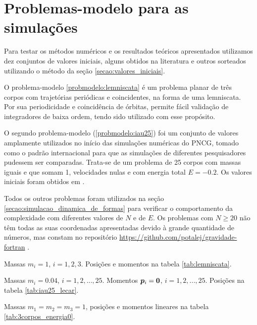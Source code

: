 \chapter{Problemas-modelo para as simulações}\label{apendice:problemas-modelo}

Para testar os métodos numéricos e os resultados teóricos apresentados utilizamos dez conjuntos de valores iniciais, alguns obtidos na literatura e outros sorteados utilizando o método da seção \ref{secao:valores_iniciais}.

O problema-modelo \ref{probmodelo:lemniscata} é um problema planar de três corpos com trajetórias periódicas e coincidentes, na forma de uma lemniscata. Por sua periodicidade e coincidência de órbitas, permite fácil validação de integradores de baixa ordem, tendo sido utilizado com esse propósito.

O segundo problema-modelo (\ref{probmodelo:iau25}) foi um conjunto de valores amplamente utilizados no início das simulações numéricas do PNCG, tomado como o padrão internacional para que as simulações de diferentes pesquisadores pudessem ser comparadas. Trata-se de um problema de 25 corpos com massas iguais e que somam 1, velocidades nulas e com energia total $E=-0.2$. Os valores iniciais foram obtidos em \cite{Lecar1968}.

Todos os outros problemas foram utilizados na seção \ref{secao:simulacao_dinamica_de_formas} para verificar o comportamento da complexidade com diferentes valores de $N$ e de $E$. Os problemas com $N \geq 20$ não têm todas as suas coordenadas apresentadas devido à grande quantidade de números, mas constam no repositório \href{https://github.com/Potalej/gravidade-fortran}{https://github.com/potalej/gravidade-fortran} \citep{potalej_gravidade-fortran}.

\begin{probmodelo}\label{probmodelo:lemniscata}
    Massas $m_i = 1$, $i=1,2,3$. Posições e momentos na tabela \ref{tab:lemniscata}.
    
\end{probmodelo}

\begin{probmodelo}\label{probmodelo:iau25} 
    Massas $m_i = 0.04$, $i=1,2,...,25$. Momentos $\bm p_i = \bm 0$, $i=1,2,...,25$. Posições na tabela \ref{tab:iau25_lecar}.
    
\end{probmodelo}

\begin{probmodelo}\label{probmodelo:3corpos_energia_nula}
    Massas $m_1 = m_2 = m_3 = 1$, posições e momentos lineares na tabela \ref{tab:3corpos_energia0}.
        
\end{probmodelo}

